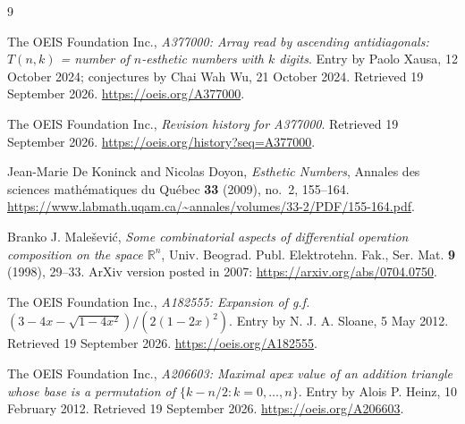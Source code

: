 \documentclass[11pt,letterpaper]{article}
\numberwithin{equation}{section}
\theoremstyle{definition}
\newcommand{\R}{\mathbb R}
\begin{document}
\begin{thebibliography}{9}
The OEIS Foundation Inc.,
\emph{A377000: Array read by ascending antidiagonals: $T(n,k)$ = number of
$n$-esthetic numbers with $k$ digits}.
Entry by Paolo Xausa, 12 October 2024; conjectures by Chai Wah Wu,
21 October 2024.  Retrieved 19 September 2026.
\url{https://oeis.org/A377000}.

The OEIS Foundation Inc., \emph{Revision history for A377000}.
Retrieved 19 September 2026.
\url{https://oeis.org/history?seq=A377000}.

Jean-Marie De Koninck and Nicolas Doyon,
\emph{Esthetic Numbers},
Annales des sciences math\'ematiques du Qu\'ebec
\textbf{33} (2009), no.~2, 155--164.
\url{https://www.labmath.uqam.ca/~annales/volumes/33-2/PDF/155-164.pdf}.

Branko J. Male\v sevi\'c,
\emph{Some combinatorial aspects of differential operation composition
on the space $\R^n$},
Univ. Beograd. Publ. Elektrotehn. Fak., Ser. Mat.
\textbf{9} (1998), 29--33.
ArXiv version posted in 2007: \url{https://arxiv.org/abs/0704.0750}.

The OEIS Foundation Inc.,
\emph{A182555: Expansion of g.f.
$(3-4x-\sqrt{1-4x^2})/(2(1-2x)^2)$}.
Entry by N. J. A. Sloane, 5 May 2012.  Retrieved 19 September 2026.
\url{https://oeis.org/A182555}.

The OEIS Foundation Inc.,
\emph{A206603: Maximal apex value of an addition triangle whose base is a
permutation of $\{k-n/2:k=0,\ldots,n\}$}.
Entry by Alois P. Heinz, 10 February 2012.  Retrieved 19 September 2026.
\url{https://oeis.org/A206603}.
\end{thebibliography}
\end{document}
